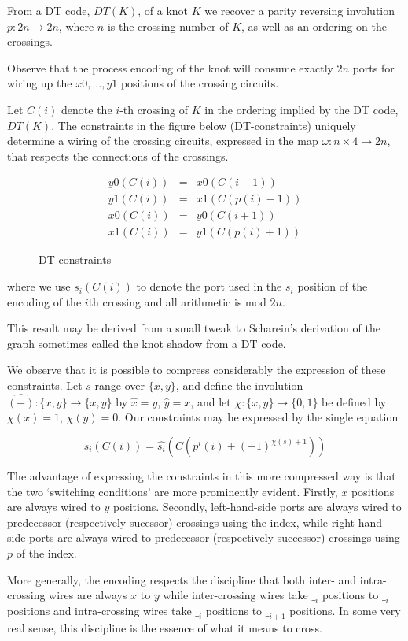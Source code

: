 \documentclass[]{llncs}
\begin{document}
 {From a DT code, $DT(K)$, of a knot $K$ we recover a parity
     reversing involution $p: 2n \to 2n$, where $n$ is the crossing
     number of $K$, as well as an ordering on the crossings.}

{Observe that the process encoding of the knot will
consume
     exactly $2n$ ports for wiring up the $x0,...,y1$ positions of the
     crossing circuits.}

{Let $C(i)$ denote the $i$-th crossing of $K$ in the
ordering
     implied by the DT code, $DT(K)$. The constraints in the figure
     below (DT-constraints) uniquely determine a wiring of the
     crossing circuits, expressed in the map $\omega: n \times 4 \to
     2n$, that respects the connections of the crossings.
     \begin{figure}[tbp]
       \begin{eqnarray}
         y0(C(i)) & = & x0(C(i-1)) \\
         y1(C(i)) & = & x1(C(p(i)-1)) \\
         x0(C(i)) & = & y0(C(i+1)) \\
         x1(C(i)) & = & y1(C(p(i)+1))
       \end{eqnarray}
       \caption{DT-constraints}
   \end{figure}
    where we use $s_i(C(i))$ to denote the port used in the $s_i$
    position of the encoding of the $i$th crossing and all arithmetic is
    mod $2n$. }


 This result may be derived from a small tweak to Scharein's
 derivation of the graph sometimes called the knot shadow from a DT
 code.  

\begin{remark}
  We observe that it is possible to compress considerably the
  expression of these constraints. Let $s$ range over $\{x,y\}$, and
  define the involution $\hat{(-)}: \{x,y\} \to \{x,y\}$ by $\hat{x} =
  y$, $\hat{y} = x$, and let $\chi : \{x,y\} \to \{0,1\}$ be defined by
  $\chi(x) = 1$, $\chi(y) = 0$. Our constraints may be expressed by the
  single equation

  \begin{equation}
    s_i(C(i)) = \hat{s_i}(C(p^i(i) + (-1)^{\chi(s)+1}))
  \end{equation}
  
  The advantage of expressing the constraints in this more compressed
  way is that the two `switching conditions' are more prominently
  evident. Firstly, $x$ positions are always wired to $y$
  positions. Secondly, left-hand-side ports are always wired to
  predecessor (respectively sucessor) crossings using the index, while
  right-hand-side ports are always wired to predecessor (respectively
  successor) crossings using $p$ of the index.

  More generally, the encoding respects the discipline that both
  inter- and intra-crossing wires are always $x$ to $y$ while
  inter-crossing wires take $\__i$ positions to $\__i$ positions and
  intra-crossing wires take $\__i$ positions to $\__{i+1}$
  positions. In some very real sense, this discipline is the essence
  of what it means to cross.
\end{remark}
\end{document}
